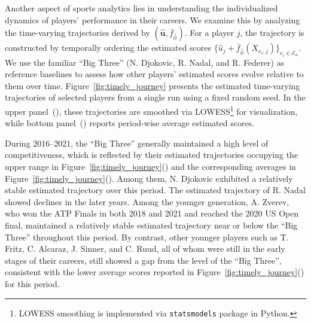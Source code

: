 \documentclass[
  12pt]{article}
\begin{document}
Another aspect of sports analytics lies in understanding the individualized dynamics of players' performance in their careers. We examine this by analyzing the time-varying trajectories derived by $(\widehat{\boldsymbol{u}},\bar{f}_{\widehat{\phi}})$. For a player $j$, the trajectory is constructed by temporally ordering the estimated scores $\{ \widehat{u}_j + \bar{f}_{\widehat{\phi}}(X_{e_i,j}) \}_{e_i \in \mathcal{E}_n}$.  We use the familiar ``Big Three'' (N. Djokovic, R. Nadal, and R. Federer) as reference baselines to assess how other players' estimated scores evolve relative to them over time.  Figure~\ref{fig:timely_journey} presents the estimated time-varying trajectories of selected players from a single run using a fixed random seed. In the upper panel~(), these trajectories are smoothed via LOWESS\footnote{LOWESS smoothing is implemented via \texttt{statsmodels} package in Python.} 
for visualization, while bottom panel~() reports period-wise average estimated scores.

During 2016–2021, the ``Big Three'' generally maintained a high level of competitiveness, which is reflected by their estimated trajectories occupying the upper range in Figure~\ref{fig:timely_journey}() and the corresponding averages in Figure~\ref{fig:timely_journey}(). Among them, N. Djokovic exhibited a relatively stable estimated trajectory over this period. The estimated trajectory of R. Nadal showed declines in the later years. Among the younger generation, A. Zverev, who won the ATP Finals in both 2018 and 2021 and reached the 2020 US Open final, maintained a relatively stable estimated trajectory near or below the ``Big Three'' throughout this period. By contrast, other younger players such as T. Fritz, C. Alcaraz, J. Sinner, and C. Ruud, all of whom were still in the early stages of their careers, still showed a gap from the level of the ``Big Three'', consistent with the lower average scores reported in Figure~\ref{fig:timely_journey}() for this period.
\end{document}
